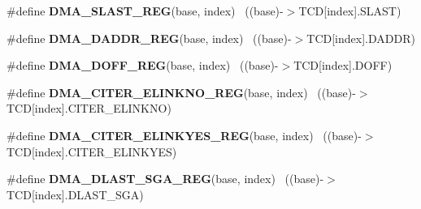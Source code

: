 \begin{DoxyCompactItemize}
\item 
\hypertarget{group___d_m_a___register___accessor___macros_gaae8a7621c8c2d1fd6a8cefb709106bf3}{}\#define {\bfseries D\+M\+A\+\_\+\+S\+L\+A\+S\+T\+\_\+\+R\+E\+G}(base,  index)                            ~((base)-\/$>$T\+C\+D\mbox{[}index\mbox{]}.S\+L\+A\+S\+T)\label{group___d_m_a___register___accessor___macros_gaae8a7621c8c2d1fd6a8cefb709106bf3}

\item 
\hypertarget{group___d_m_a___register___accessor___macros_ga8e10a0966a8bfd63350c5ed5842f3602}{}\#define {\bfseries D\+M\+A\+\_\+\+D\+A\+D\+D\+R\+\_\+\+R\+E\+G}(base,  index)                            ~((base)-\/$>$T\+C\+D\mbox{[}index\mbox{]}.D\+A\+D\+D\+R)\label{group___d_m_a___register___accessor___macros_ga8e10a0966a8bfd63350c5ed5842f3602}

\item 
\hypertarget{group___d_m_a___register___accessor___macros_gaa25d270e7da8eb31bb39b2e9b3898966}{}\#define {\bfseries D\+M\+A\+\_\+\+D\+O\+F\+F\+\_\+\+R\+E\+G}(base,  index)                              ~((base)-\/$>$T\+C\+D\mbox{[}index\mbox{]}.D\+O\+F\+F)\label{group___d_m_a___register___accessor___macros_gaa25d270e7da8eb31bb39b2e9b3898966}

\item 
\hypertarget{group___d_m_a___register___accessor___macros_ga82c3646d7dc1682c403538b2b7d2a4f8}{}\#define {\bfseries D\+M\+A\+\_\+\+C\+I\+T\+E\+R\+\_\+\+E\+L\+I\+N\+K\+N\+O\+\_\+\+R\+E\+G}(base,  index)            ~((base)-\/$>$T\+C\+D\mbox{[}index\mbox{]}.C\+I\+T\+E\+R\+\_\+\+E\+L\+I\+N\+K\+N\+O)\label{group___d_m_a___register___accessor___macros_ga82c3646d7dc1682c403538b2b7d2a4f8}

\item 
\hypertarget{group___d_m_a___register___accessor___macros_ga2b6ebca3cfe6042df1d2da056d6314eb}{}\#define {\bfseries D\+M\+A\+\_\+\+C\+I\+T\+E\+R\+\_\+\+E\+L\+I\+N\+K\+Y\+E\+S\+\_\+\+R\+E\+G}(base,  index)          ~((base)-\/$>$T\+C\+D\mbox{[}index\mbox{]}.C\+I\+T\+E\+R\+\_\+\+E\+L\+I\+N\+K\+Y\+E\+S)\label{group___d_m_a___register___accessor___macros_ga2b6ebca3cfe6042df1d2da056d6314eb}

\item 
\hypertarget{group___d_m_a___register___accessor___macros_ga63bcd63e7f74154aeea9dbd747ddeb5a}{}\#define {\bfseries D\+M\+A\+\_\+\+D\+L\+A\+S\+T\+\_\+\+S\+G\+A\+\_\+\+R\+E\+G}(base,  index)                    ~((base)-\/$>$T\+C\+D\mbox{[}index\mbox{]}.D\+L\+A\+S\+T\+\_\+\+S\+G\+A)\label{group___d_m_a___register___accessor___macros_ga63bcd63e7f74154aeea9dbd747ddeb5a}


\end{DoxyCompactItemize}
